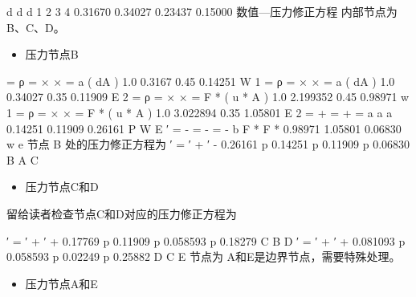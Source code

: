 \documentclass[11pt,a4paper,openany,fontset=none]{ctexbook}
\begin{document}
d d d 1 2 3 4 0.31670 0.34027 0.23437 0.15000
数值---压力修正方程
内部节点为B、C、D。

\begin{itemize}

\item 压力节点B

\end{itemize}

= ρ = × × = a ( dA ) 1.0 0.3167 0.45 0.14251 W 1 = ρ = × × = a ( dA ) 1.0 0.34027 0.35 0.11909 E 2 = ρ = × × = F * ( u * A ) 1.0 2.199352 0.45 0.98971 w 1 = ρ = × × = F * ( u * A ) 1.0 3.022894 0.35 1.05801 E 2 = + = + = a a a 0.14251 0.11909 0.26161 P W E ′ = - = - = - b F * F * 0.98971 1.05801 0.06830 w e 节点 B 处的压力修正方程为 ′ = ′ + ′ - 0.26161 p 0.14251 p 0.11909 p 0.06830 B A C

\begin{itemize}

\item 压力节点C和D

\end{itemize}

留给读者检查节点C和D对应的压力修正方程为

′ = ′ + ′ + 0.17769 p 0.11909 p 0.058593 p 0.18279 C B D ′ = ′ + ′ + 0.081093 p 0.058593 p 0.02249 p 0.25882 D C E 节点为 A和E是边界节点，需要特殊处理。

\begin{itemize}

\item 压力节点A和E

\end{itemize}
\end{document}
